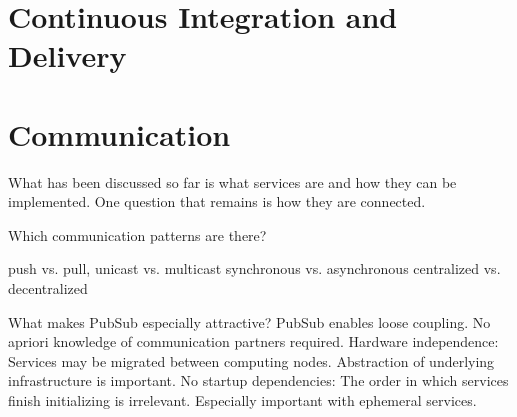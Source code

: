


\section{Continuous Integration and Delivery}



\section{Communication}

What has been discussed so far is what services are and how they can be implemented. One question that remains is how they are connected. 

Which communication patterns are there?

push vs. pull,
unicast vs. multicast
synchronous vs. asynchronous
centralized vs. decentralized

What makes PubSub especially attractive?
PubSub enables loose coupling. No apriori knowledge of communication partners required. Hardware independence: Services may be migrated between computing nodes. Abstraction of underlying infrastructure is important.
No startup dependencies: The order in which services finish initializing is irrelevant. Especially important with ephemeral services.


